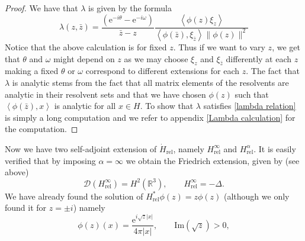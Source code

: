\documentclass[a4paper,11pt]{article}
\newcommand{\euler}[1]{\text{e}^{#1}}
\newcommand{\Imag}{\text{Im}}
\newcommand{\dom}[1]{\mathscr D\left(#1\right)}
\renewcommand{\braket}[1]{\left\langle#1\right\rangle}
\newcommand{\R}{\mathbb{R}}
\numberwithin{equation}{section}
\begin{document}
\begin{proof}
	We have that $ \lambda $ is given by the formula \begin{equation}
	\lambda(z,\bar{z})=\frac{(\euler{-i\theta}-\euler{-i\omega})}{\bar{z}-z}\frac{\braket{\phi(z)\xi_{z}}}{\braket{\phi(\bar{z}),\xi_{\bar{z}}}\|\phi(z)\|^2}
	\end{equation}
Notice that the above calculation is for fixed $ z $. Thus if we want to vary $ z $, we get that $ \theta $ and $ \omega $ might depend on $ z $ as we may choose $ \xi_z $ and $ \xi_{\bar{z}} $ differently at each $ z $ making a fixed $ \theta $ or $ \omega $ correspond to different extensions for  each $ z $.
 The fact that $ \lambda $ is analytic stems from the fact that all matrix elements of the resolvents are analytic in their resolvent sets and that we have chosen $ \phi(z) $ such that $ \braket{\phi(\bar{z}),x} $ is analytic for all $ x\in H $. To show that $ \lambda $ satisfies \eqref{lambda relation} is simply a long computation and we refer to appendix \ref{Lambda calculation} for the computation. 
\end{proof}
Now we have two self-adjoint extension of $ \dot{H}_{\text{rel}} $, namely $ H_{\text{rel}}^\infty $ and $ H_{\text{rel}}^{\alpha} $. It is easily verified that by imposing $ \alpha=\infty $ we obtain the Friedrich extension, given by (see above)\begin{equation}
\dom{H_{\text{rel}}^\infty}=H^2(\R^3),\qquad H_{\text{rel}}^\infty=-\Delta.
\end{equation}  We have already found the solution of $ H_{\text{rel}}^*\phi(z)=z\phi(z) $ (although we only found it for $ z=\pm i $) namely\begin{equation}
\phi(z)(x)=\frac{\euler{i\sqrt{z}|x|}}{4\pi|x|},\qquad \Imag(\sqrt{z})>0,
\end{equation}
\end{document}
